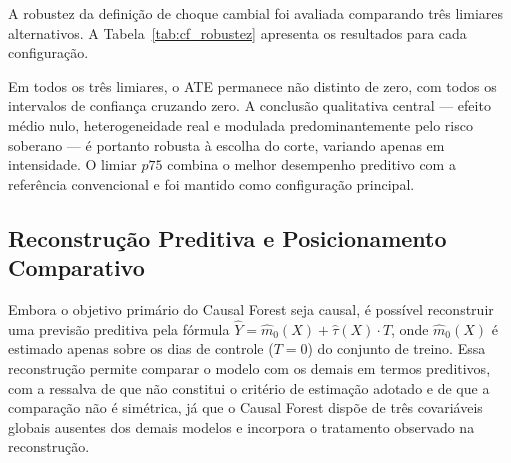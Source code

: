 \documentclass[	12pt, Times, openright, oneside, a4paper, english, brazil]{abntex2}
\begin{document}
A robustez da definição de choque cambial foi avaliada comparando três limiares alternativos. A Tabela~\ref{tab:cf_robustez} apresenta os resultados para cada configuração.

\begin{table}[ht!]
\centering
{}
\caption{Comparativo de desempenho entre os três limiares de choque cambial ($p70$, $p75$, $p80$). Em todos os casos, o ATE não é estatisticamente distinto de zero e a heterogeneidade permanece detectável. O limiar $p75$ (negrito) foi adotado como configuração principal por combinar o melhor R² preditivo com a justificativa convencional na literatura de volatilidade cambial.}\label{tab:cf_robustez}
\end{table}

Em todos os três limiares, o ATE permanece não distinto de zero, com todos os intervalos de confiança cruzando zero. A conclusão qualitativa central — efeito médio nulo, heterogeneidade real e modulada predominantemente pelo risco soberano — é portanto robusta à escolha do corte, variando apenas em intensidade. O limiar $p75$ combina o melhor desempenho preditivo com a referência convencional e foi mantido como configuração principal.

\subsection{Reconstrução Preditiva e Posicionamento Comparativo}

Embora o objetivo primário do Causal Forest seja causal, é possível reconstruir uma previsão preditiva pela fórmula $\hat{Y} = \hat{m}_0(X) + \hat{\tau}(X) \cdot T$, onde $\hat{m}_0(X)$ é estimado apenas sobre os dias de controle ($T = 0$) do conjunto de treino. Essa reconstrução permite comparar o modelo com os demais em termos preditivos, com a ressalva de que não constitui o critério de estimação adotado e de que a comparação não é simétrica, já que o Causal Forest dispõe de três covariáveis globais ausentes dos demais modelos e incorpora o tratamento observado na reconstrução.
\end{document}

